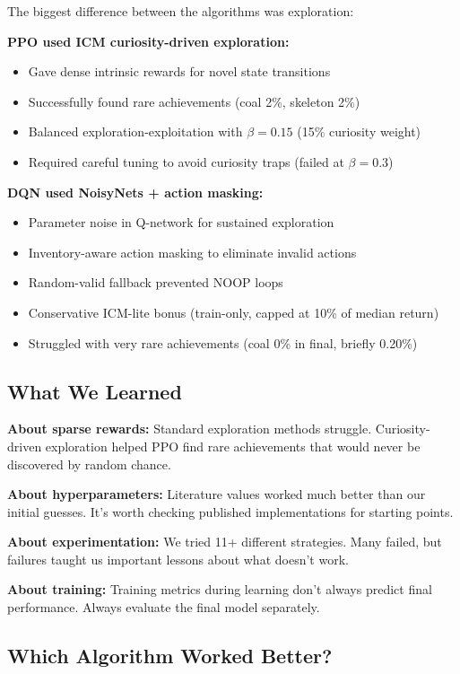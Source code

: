 \documentclass[conference]{IEEEtran}
\begin{document}
The biggest difference between the algorithms was exploration:

\textbf{PPO used ICM curiosity-driven exploration:}
\begin{itemize}
    \item Gave dense intrinsic rewards for novel state transitions
    \item Successfully found rare achievements (coal 2\%, skeleton 2\%)
    \item Balanced exploration-exploitation with $\beta=0.15$ (15\% curiosity weight)
    \item Required careful tuning to avoid curiosity traps (failed at $\beta=0.3$)
\end{itemize}

\textbf{DQN used NoisyNets + action masking:}
\begin{itemize}
    \item Parameter noise in Q-network for sustained exploration
    \item Inventory-aware action masking to eliminate invalid actions
    \item Random-valid fallback prevented NOOP loops
    \item Conservative ICM-lite bonus (train-only, capped at 10\% of median return)
    \item Struggled with very rare achievements (coal 0\% in final, briefly 0.20\%)
\end{itemize}

\subsection{What We Learned}

\textbf{About sparse rewards:} Standard exploration methods struggle. Curiosity-driven exploration helped PPO find rare achievements that would never be discovered by random chance.

\textbf{About hyperparameters:} Literature values worked much better than our initial guesses. It's worth checking published implementations for starting points.

\textbf{About experimentation:} We tried 11+ different strategies. Many failed, but failures taught us important lessons about what doesn't work.

\textbf{About training:} Training metrics during learning don't always predict final performance. Always evaluate the final model separately.

\subsection{Which Algorithm Worked Better?}
\end{document}
